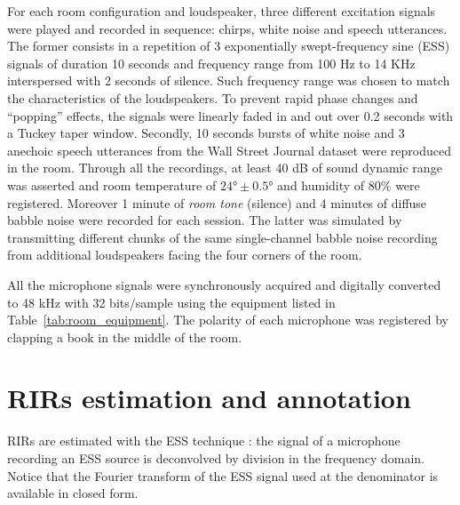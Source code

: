 


For each room configuration and loudspeaker, three different excitation signals were played and recorded in sequence: chirps, white noise and speech utterances. The former consists in a repetition of 3 exponentially swept-frequency sine (ESS) signals of duration 10 seconds and frequency range from 100 Hz to 14 KHz interspersed with 2 seconds of silence. Such frequency range was chosen to match the characteristics of the loudspeakers. To prevent rapid phase changes and ``popping'' effects, the signals were linearly faded in and out over 0.2 seconds with a Tuckey taper window.
Secondly, 10 seconds bursts of white noise and 3 anechoic speech utterances from the Wall Street Journal dataset  were reproduced in the room. Through all the recordings, at least 40 dB of sound dynamic range was asserted and room temperature of $\ang{24} \pm \ang{0.5}$ and humidity of $80\%$ were registered. Moreover 1 minute of \textit{room tone} (silence) and 4 minutes of diffuse babble noise were recorded for each session. The latter was simulated by transmitting different chunks of the same single-channel babble noise recording from additional loudspeakers facing the four corners of the room.

All the microphone signals were synchronously acquired and digitally converted to 48 kHz with 32 bits/sample using the equipment listed in Table~\ref{tab:room_equipment}. The polarity of each microphone was registered by clapping a book in the middle of the room.

\section{RIRs estimation and annotation}\label{sec:annotation}
RIRs are estimated with the ESS technique : the signal of a microphone recording an ESS source is deconvolved by division in the frequency domain. Notice that the Fourier transform of the ESS signal used at the denominator is available in closed form.

